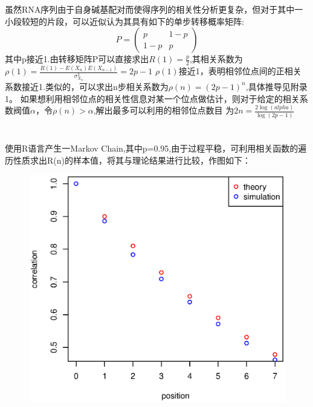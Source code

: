 \documentclass[12pt]{article}
\begin{document}
\title{\textbf{}} 

\author{}
\maketitle
\large
\section{\textbf{}}
虽然RNA序列由于自身碱基配对而使得序列的相关性分析更复杂，但对于其中一小段较短的片段，可以近似认为其具有如下的单步转移概率矩阵:
\[
P=\left(
\begin{array}{cc}
p & 1-p \\
1-p & p
\end{array}
\right)
\]
其中p接近1.由转移矩阵P可以直接求出$R(1)=\frac{p}{2}$,其相关系数为$\rho(1)=\frac{R(1)-E(X_n)E(X_{n-1})}{\sigma_{X_n}^2}=2p-1$
$\rho(1)$接近1，表明相邻位点间的正相关系数接近1.类似的，可以求出n步相关系数为$\rho(n)=(2p-1)^n$,具体推导见附录1。
如果想利用相邻位点的相关性信息对某一个位点做估计，则对于给定的相关系数阀值$\alpha$，令$\rho(n)>\alpha$,解出最多可以利用的相邻位点数目
为$2n=\frac{2\log(alpha)}{\log(2p-1)}$
\section{\textbf{}}
使用R语言产生一Markov Chain,其中p=0.95,由于过程平稳，可利用相关函数的遍历性质求出R(n)的样本值，将其与理论结果进行比较，作图如下：
\begin{figure}[!ht]
\centering
\includegraphics{Plotting1.eps}
\end{figure}
\newpage
\end{document}
